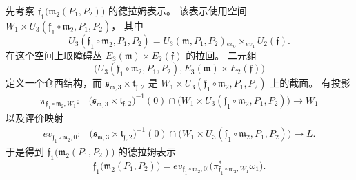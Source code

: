 先考察
$\mathfrak f_1\bigl(\mathfrak m_2(P_1,P_2)\bigr)$
的德拉姆表示。
该表示使用空间
$W_1\times U_3(\mathfrak f_1\circ\mathfrak m_2,P_1,P_2)$，
其中
\begin{equation}
U_3(\mathfrak f_1\circ\mathfrak m_2,P_1,P_2)
=U_3(\mathfrak m,P_1,P_2)
{}_{ev_0}\!\mathbin{\times_{ev_1}}U_2(\mathfrak f).
\tag{7.5.19}\label{eq:7-5-19}
\end{equation}
在这个空间上取障碍丛
$E_3(\mathfrak m)\times E_2(\mathfrak f)$ 的拉回。
二元组
\[
\bigl(U_3(\mathfrak f_1\circ\mathfrak m_2,P_1,P_2),
E_3(\mathfrak m)\times E_2(\mathfrak f)\bigr)
\]
定义一个仓西结构，而
$\mathfrak s_{\mathfrak m,3}\times\mathfrak t_{\mathfrak f,2}$
是 $W_1\times
U_3(\mathfrak f_1\circ\mathfrak m_2,P_1,P_2)$ 上的截面。
有投影
\[
\begin{aligned}
\pi_{\mathfrak f_1\circ\mathfrak m_2,W_1}\colon
&\bigl(\mathfrak s_{\mathfrak m,3}
\times\mathfrak t_{\mathfrak f,2}\bigr)^{-1}(0)
\cap\bigl(W_1\times
U_3(\mathfrak f_1\circ\mathfrak m_2,P_1,P_2)\bigr)
\longrightarrow W_1
\end{aligned}
\]
以及评价映射
\[
\begin{aligned}
ev_{\mathfrak f_1\circ\mathfrak m_2,0}\colon
&\bigl(\mathfrak s_{\mathfrak m,3}
\times\mathfrak t_{\mathfrak f,2}\bigr)^{-1}(0)
\cap\bigl(W_1\times
U_3(\mathfrak f_1\circ\mathfrak m_2,P_1,P_2)\bigr)
\longrightarrow L.
\end{aligned}
\]
于是得到
$\mathfrak f_1\bigl(\mathfrak m_2(P_1,P_2)\bigr)$
的德拉姆表示
\begin{equation}
\mathfrak f_1\bigl(\mathfrak m_2(P_1,P_2)\bigr)
=ev_{\mathfrak f_1\circ\mathfrak m_2,0!}
\bigl(\pi_{\mathfrak f_1\circ\mathfrak m_2,W_1}^*\omega_1\bigr).
\tag{7.5.20}\label{eq:7-5-20}
\end{equation}

